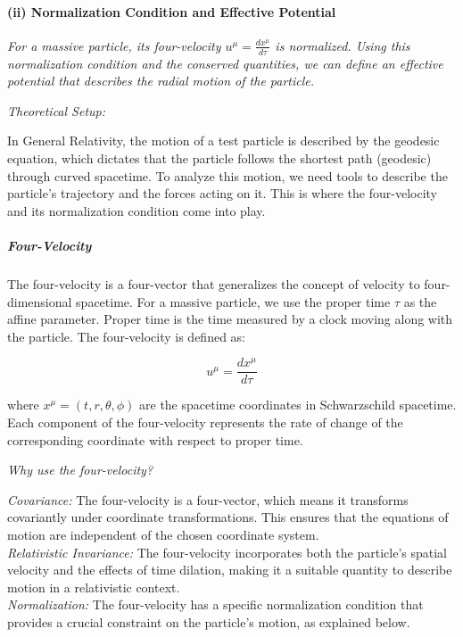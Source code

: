 \documentclass{article}
\begin{document}
\paragraph{(ii) Normalization Condition and Effective Potential}
\textit{For a massive particle, its four-velocity \(u^\mu = \frac{dx^\mu}{d\tau}\) is normalized. Using this normalization condition and the conserved quantities, we can define an effective potential that describes the radial motion of the particle.}

\textit{Theoretical Setup:}

In General Relativity, the motion of a test particle is described by the geodesic equation, which dictates that the particle follows the shortest path (geodesic) through curved spacetime. To analyze this motion, we need tools to describe the particle's trajectory and the forces acting on it. This is where the four-velocity and its normalization condition come into play.

\subparagraph{Four-Velocity}

The four-velocity is a four-vector that generalizes the concept of velocity to four-dimensional spacetime. For a massive particle, we use the proper time \(\tau\) as the affine parameter. Proper time is the time measured by a clock moving along with the particle. The four-velocity is defined as:

\begin{equation*}
u^\mu = \frac{dx^\mu}{d\tau}
\end{equation*}

where \(x^\mu = (t, r, \theta, \phi)\) are the spacetime coordinates in Schwarzschild spacetime. Each component of the four-velocity represents the rate of change of the corresponding coordinate with respect to proper time.

\textit{Why use the four-velocity?}

\textit{Covariance:} The four-velocity is a four-vector, which means it transforms covariantly under coordinate transformations. This ensures that the equations of motion are independent of the chosen coordinate system.\\
\textit{Relativistic Invariance:} The four-velocity incorporates both the particle's spatial velocity and the effects of time dilation, making it a suitable quantity to describe motion in a relativistic context.\\
\textit{Normalization:} The four-velocity has a specific normalization condition that provides a crucial constraint on the particle's motion, as explained below.
\end{document}
